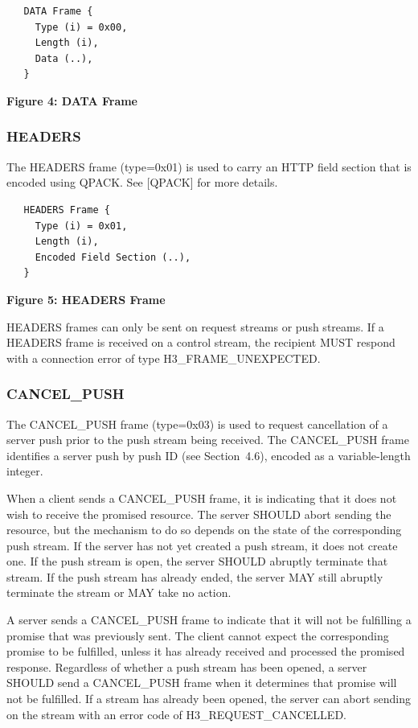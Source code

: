 \documentclass{article}
\begin{document}
\begin{verbatim}
   DATA Frame {
     Type (i) = 0x00,
     Length (i),
     Data (..),
   }
\end{verbatim}

\begin{center}
\textbf{Figure 4: DATA Frame}
\end{center}

\subsubsection{HEADERS}

The HEADERS frame (type=0x01) is used to carry an HTTP field section that is encoded using QPACK.  See [QPACK] for more details.

\begin{verbatim}
   HEADERS Frame {
     Type (i) = 0x01,
     Length (i),
     Encoded Field Section (..),
   }
\end{verbatim}

\begin{center}
\textbf{Figure 5: HEADERS Frame}
\end{center}

HEADERS frames can only be sent on request streams or push streams. If a HEADERS frame is received on a control stream, the recipient MUST respond with a connection error of type H3\_FRAME\_UNEXPECTED.

\subsubsection{CANCEL\_PUSH}

The CANCEL\_PUSH frame (type=0x03) is used to request cancellation of a server push prior to the push stream being received.  The CANCEL\_PUSH frame identifies a server push by push ID (see Section~4.6), encoded as a variable-length integer.

When a client sends a CANCEL\_PUSH frame, it is indicating that it does not wish to receive the promised resource.  The server SHOULD abort sending the resource, but the mechanism to do so depends on the state of the corresponding push stream.  If the server has not yet created a push stream, it does not create one.  If the push stream is open, the server SHOULD abruptly terminate that stream.  If the push stream has already ended, the server MAY still abruptly terminate the stream or MAY take no action.

A server sends a CANCEL\_PUSH frame to indicate that it will not be fulfilling a promise that was previously sent.  The client cannot expect the corresponding promise to be fulfilled, unless it has already received and processed the promised response.  Regardless of whether a push stream has been opened, a server SHOULD send a CANCEL\_PUSH frame when it determines that promise will not be fulfilled.  If a stream has already been opened, the server can abort sending on the stream with an error code of H3\_REQUEST\_CANCELLED.
\end{document}
